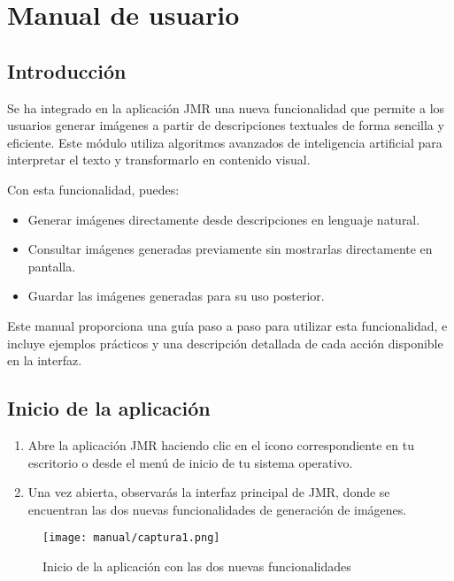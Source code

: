 \section{Manual de usuario}

\subsection{Introducción} 
Se ha integrado en la aplicación JMR una nueva funcionalidad que permite a los usuarios generar imágenes a partir de descripciones textuales de forma sencilla y eficiente. Este módulo utiliza algoritmos avanzados de inteligencia artificial para interpretar el texto y transformarlo en contenido visual.

Con esta funcionalidad, puedes:
\begin{itemize}
    \item Generar imágenes directamente desde descripciones en lenguaje natural.
    \item Consultar imágenes generadas previamente sin mostrarlas directamente en pantalla.
    \item Guardar las imágenes generadas para su uso posterior.
\end{itemize}

Este manual proporciona una guía paso a paso para utilizar esta funcionalidad, e incluye ejemplos prácticos y una descripción detallada de cada acción disponible en la interfaz.

\subsection{Inicio de la aplicación}
\begin{enumerate}
    \item Abre la aplicación JMR haciendo clic en el icono correspondiente en tu escritorio o desde el menú de inicio de tu sistema operativo.
    \item Una vez abierta, observarás la interfaz principal de JMR, donde se encuentran las dos nuevas funcionalidades de generación de imágenes.
\end{enumerate}

\begin{figure}[H]
    \centering
    \texttt{[image: manual/captura1.png]}
    \caption{Inicio de la aplicación con las dos nuevas funcionalidades}
    \label{fig:inicio}
\end{figure}


